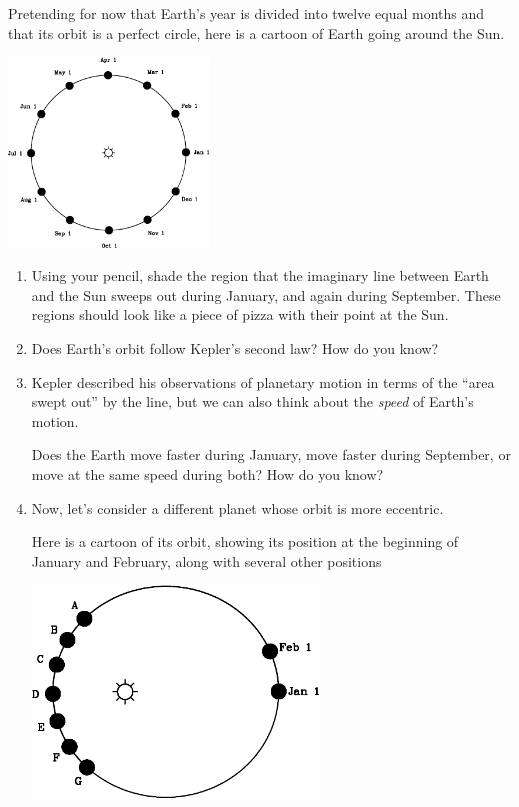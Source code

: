 \documentclass[12pt]{article}
\begin{document}
Pretending for now that Earth's year is divided into twelve equal months and that its orbit is a perfect circle, here is a cartoon of Earth going around the Sun.
\begin{center}
\includegraphics[width=0.4\textwidth]{earth-crop.pdf}
\end{center}
\begin{enumerate}
\item Using your pencil, shade the region that the imaginary line between Earth and the Sun sweeps out during January, and again during September.  These regions should look like a piece of pizza with their point at the Sun.
\bigskip
\item Does Earth's orbit follow Kepler's second law? How do you know? 

\vspace{1.6in}

\item Kepler described his observations of planetary motion in terms of the ``area swept out'' by the line, but we can also think about the {\it speed} of Earth's motion.


Does the Earth move faster during January, move faster during September, or move at the same speed during both? How do you know?

\newpage

\item Now, let's consider a different planet whose orbit is more eccentric. 

Here is a cartoon of its orbit, showing its position at the beginning of January and February, along with several other positions

\begin{center}
	\includegraphics[width=3in]{pick-one-crop.pdf}
	

\end{center}
\end{enumerate}
\end{document}
